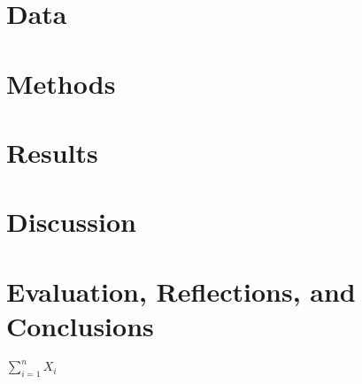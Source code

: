 \documentclass[]{article}
\begin{document}
\hypertarget{data}{%
\section{Data}\label{data}}

\hypertarget{methods}{%
\section{Methods}\label{methods}}

\hypertarget{results}{%
\section{Results}\label{results}}

\hypertarget{discussion}{%
\section{Discussion}\label{discussion}}

\hypertarget{evaluation-reflections-and-conclusions}{%
\section{Evaluation, Reflections, and
Conclusions}\label{evaluation-reflections-and-conclusions}}

\(\sum_{i=1}^n X_i\)
\end{document}
